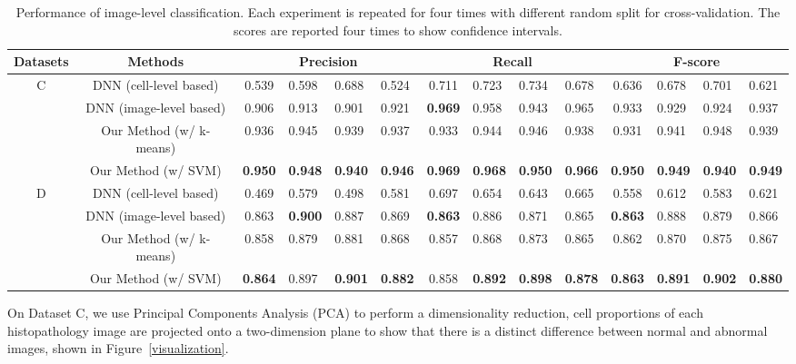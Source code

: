 \documentclass[journal]{IEEEtran}
\begin{document}
\begin{table*}[tbh!]
\centering
\caption{{\textnormal{Performance of image-level classification. Each experiment is repeated for four times with different random split for cross-validation. The scores are reported four times to show confidence intervals.}}}
\label{imagelevel}
\begin{tabular}{|c|c|c|l|l|l|c|l|l|l|c|l|l|l|}
\hline
Datasets           & Methods                   & \multicolumn{4}{c|}{Precision}         & \multicolumn{4}{c|}{Recall}            & \multicolumn{4}{c|}{F-score}           \\ \hline
\multirow{4}{*}{C} & {DNN (cell-level based)} &{0.539}&{0.598}&{0.688}&{0.524}
                                       &{0.711}& {0.723}&{0.734}&{0.678}
                                       &{0.636}&{0.678}&{0.701}&{0.621}       \\
                   & DNN (image-level based)&0.906 & {0.913} & {0.901} &{0.921}
                                      & \textbf{0.969} &{0.958} &{0.943} &{0.965}
                                      & 0.933 & {0.929} & {0.924} & {0.937} \\
                   & Our Method (w/ k-means) & 0.936          & {0.945}  & {0.939} &{0.937} &0.933          &{0.944} &{0.946} &{0.938} &0.931          &{0.941}   &{0.948}  & {0.939} \\
                   & Our Method (w/ SVM)     & \textbf{0.950} & {\textbf{0.948}} &{\textbf{0.940}} & {\textbf{0.946}} &\textbf{0.969} &{\textbf{0.968}} & {\textbf{0.950}} &{\textbf{0.966}} & \textbf{0.950} &{\textbf{0.949}}  &{\textbf{0.940}}  &{\textbf{0.949}}    \\ \hline
\multirow{4}{*}{{D}} & {DNN (cell-level based)}  &{0.469}&{0.579}&{0.498}&{0.581}                                             &{0.697}&{0.654}&{0.643}&{0.665}                                             &{0.558}&{0.612}&{0.583}&{0.621}       \\
                   & {DNN (image-level based)}         &{0.863}&{\textbf{0.900}}&{0.887}&{0.869}   &{\textbf{0.863}}&{0.886}&{0.871}&{0.865}   &{\textbf{0.863}}&{0.888}&{0.879}&{0.866}  \\
                   & {Our Method (w/ k-means)} &{0.858}           &{0.879}  &{0.881}  &{0.868}   &{0.857}           &{0.868}  &{0.873}  &{0.865}   &{0.862}           &{0.870}  &{0.875}  &{0.867}  \\
                   & {Our Method (w/ SVM)}     &{\textbf{0.864}}           &{0.897}  &{\textbf{0.901}}  &{\textbf{0.882}}   &{0.858}           &{\textbf{0.892}}  &{\textbf{0.898}}  &{\textbf{0.878}}   &{\textbf{0.863}}           &{\textbf{0.891}}  &{\textbf{0.902}}  &{\textbf{0.880}}  \\ \hline
\end{tabular}
\end{table*}
On Dataset C, we use Principal Components Analysis (PCA) to perform a dimensionality reduction, cell proportions of each histopathology image are projected onto a two-dimension plane to show that there is a distinct difference between normal and abnormal images, shown in Figure~\ref{visualization}.
\end{document}
